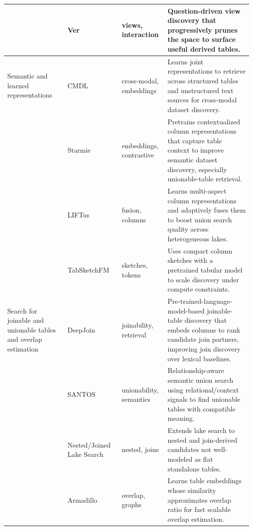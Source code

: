 \documentclass[sigconf]{acmart}
\begin{document}
\begin{table}[!htbp]
\begin{tabularx}{\textwidth}{@{}p{24mm}p{28mm}p{18mm}Y@{}}
~ &
Ver~\cite{10184768} &
views, interaction &
Question-driven view discovery that progressively prunes the space to surface useful derived tables. \\

\midrule

Semantic and learned representations &
CMDL~\cite{10.14778/3611479.3611533} &
cross-modal, embeddings &
Learns joint representations to retrieve across structured tables and unstructured text sources for cross-modal dataset discovery. \\

~ &
Starmie~\cite{10.14778/3587136.3587146} &
embeddings, contrastive &
Pretrains contextualized column representations that capture table context to improve semantic dataset discovery, especially unionable-table retrieval. \\

~ &
LIFTus~\cite{11113165} &
fusion, columns &
Learns multi-aspect column representations and adaptively fuses them to boost union search quality across heterogeneous lakes. \\

~ &
TabSketchFM~\cite{11113110} &
sketches, tokens &
Uses compact column sketches with a pretrained tabular model to scale discovery under compute constraints. \\

\midrule

Search for joinable and unionable tables and overlap estimation &
DeepJoin~\cite{10.14778/3603581.3603587} &
joinability, retrieval &
Pre-trained-language-model-based joinable-table discovery that embeds columns to rank candidate join partners, improving join discovery over lexical baselines. \\

~ &
SANTOS~\cite{10.1145/3588689} &
unionability, semantics &
Relationship-aware semantic union search using relational/context signals to find unionable tables with compatible meaning. \\

~ &
Nested/Joined Lake Search~\cite{10.14778/3681954.3682005} &
nested, joins &
Extends lake search to nested and join-derived candidates not well-modeled as flat standalone tables. \\

~ &
Armadillo~\cite{10.1145/3725365} &
overlap, graphs &
Learns table embeddings whose similarity approximates overlap ratio for fast scalable overlap estimation. \\


\end{tabularx}
\end{table}
\end{document}

